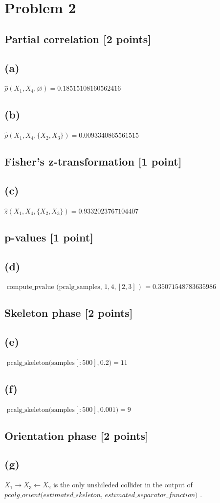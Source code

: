 \documentclass[10pt]{article}
\begin{document}
\section{Problem 2}
\subsection{Partial correlation [2 points]}
\subsection{(a)}
$\hat{\rho}\left(X_1, X_4, \varnothing\right) = 0.18515108160562416$

\subsection{(b)}
$\hat{\rho}\left(X_1, X_4, \{X_2, X_3\}\right) = 0.0093340865561515$

\subsection{Fisher’s z-transformation [1 point]}
\subsection{(c)}
$\hat{z}\left(X_1, X_4, \{X_2, X_3\}\right) = 0.9332023767104407$

\subsection{p-values [1 point]}
\subsection{(d)}
$\text { compute\_pvalue (pcalg\_samples, } 1,4,[2,3] \text { ) } = 0.35071548783635986$

\subsection{Skeleton phase [2 points]}
\subsection*{(e)}
$\text { pcalg\_skeleton(samples}[: 500], 0.2) = 11$
\subsection*{(f)}
$\text { pcalg\_skeleton(samples}[: 500], 0.001) = 9$

\subsection{Orientation phase [2 points]}
\subsection*{(g)}
$X_1 \rightarrow X_3 \leftarrow X_2$ is the only unshileded collider in the output of $\textit{pcalg\_orient(estimated\_skeleton, estimated\_separator\_function) }$. 
\end{document}
